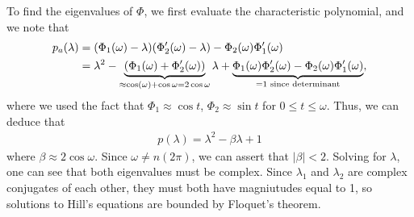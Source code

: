 \documentclass{article}
\begin{document}
\begin{example}{}
    To find the eigenvalues of $\Phi$, we first evaluate the characteristic polynomial, and we note that 
    \begin{align*}
        p_a(\lambda) &= (\Phi_1(\omega) - \lambda) (\Phi_2'(\omega) - \lambda) - \Phi_2(\omega) \Phi_1'(\omega) \\
        &= \lambda^2 - \underbrace{(\Phi_1(\omega) + \Phi_2'(\omega))}_{\approx \cos(\omega) + \cos \omega
        = 2\cos \omega} \lambda + \underbrace{\Phi_1(\omega) \Phi_2'(\omega) - \Phi_2(\omega) \Phi_1'(\omega)}_{= 1 \text{ since determinant}},
    \end{align*}
    where we used the fact that $\Phi_1 \approx \cos t$, $\Phi_2 \approx \sin t$ for $0 \leq t \leq \omega$. Thus, we can deduce that 
    \begin{align*}
        p(\lambda) = \lambda^2 - \beta \lambda + 1
    \end{align*}
    where $\beta \approx 2 \cos \omega$. Since $\omega \neq n(2\pi)$, we can assert that $|\beta| < 2$. Solving for $\lambda$, one can see that both eigenvalues must be complex. Since $\lambda_1$ and $\lambda_2$ are complex conjugates of each other, they must both have magniutudes equal to 1, so solutions to Hill's equations are bounded by Floquet's theorem. 

\end{example}
\end{document}
